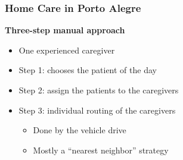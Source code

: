 \begin{frame}
   \frametitle{Home Care in Porto Alegre}


   \textbf{Three-step manual approach}
   \begin{itemize}
      \item One experienced caregiver
      \item Step 1: chooses the patient of the day
      \item Step 2: assign the patients to the caregivers
      \item Step 3: individual routing of the caregivers
      \begin{itemize}
         \item Done by the vehicle drive
         \item Mostly a ``nearest neighbor'' strategy
      \end{itemize}
   \end{itemize}

\end{frame}

%

